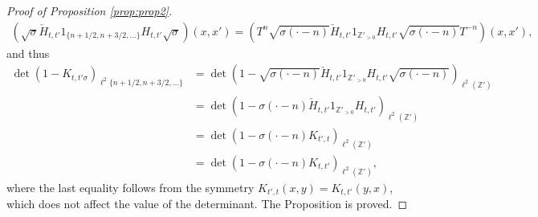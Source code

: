 \documentclass[10pt,a4paper]{amsart}
\newcommand{\Z}{\mathbb{Z}}
\begin{document}
\begin{proof}[Proof of Proposition \ref{prop:prop2}]
\begin{align*}
    \left(\sqrt{\sigma} \check{H}_{t,t'} \mathfrak{1}_{\{n+1/2,n+3/2,\dots\}}H_{t,t'} \sqrt{\sigma}\right)(x,x')=\left(T^n\sqrt{\sigma(\cdot -n)}\check{H}_{t,t'}\mathfrak{1}_{\Z'_{>0}}H_{t,t'}\sqrt{\sigma(\cdot -n)} T^{-n}\right)(x,x'),
\end{align*}
and thus
\begin{align*}
\det \left( 1 -K_{t,t'\sigma} \right)_{\ell^2 \{n+1/2,n+3/2, \dots \}}&= \det \left( 1- \sqrt{\sigma (\cdot -n) } \check{H}_{t,t'} \mathfrak{1}_{\Z'_{> 0}} H_{t,t'} \sqrt{\sigma( \cdot - n) } \right)_{\ell^2(\Z')} \\
&= \det \left( 1- \sigma( \cdot - n ) \check{ H}_{t,t'} \mathfrak{1}_{ \Z'_{> 0}} H_{t,t'}  \right)_{\ell^2(\Z')}\\
&= \det\left(1- \sigma(\cdot-n)K_{t',t}\right)_{\ell^2(\Z')}\\
&=\det\left(1- \sigma(\cdot -n)K_{t,t'}\right)_{\ell^2(\Z')},
\end{align*}
where the last equality follows from the symmetry $K_{t',t}(x,y)=K_{t,t'}(y,x)$, which does not affect the value of the determinant. The Proposition is proved.
\end{proof}
\end{document}

